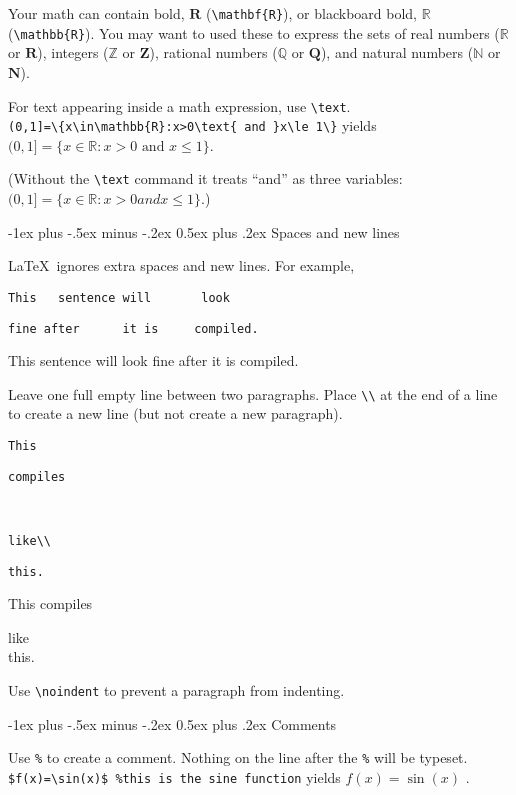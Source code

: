 \documentclass[10pt,landscape,letterpaper]{article}
\makeatletter
\renewcommand{\section}{\@startsection{section}{1}{0mm}%
                                {-1ex plus -.5ex minus -.2ex}%
                                {0.5ex plus .2ex}%
                                {\sffamily\large}}
\makeatother
\begin{document}
\begin{multicols}{3}
Your math can contain bold, $\mathbf{R}$ (\verb!\mathbf{R}!), or blackboard bold, $\mathbb{R}$ (\verb!\mathbb{R}!).
You may want to used these to express the sets of real numbers ($\mathbb{R}$ or $\mathbf{R}$), integers ($\mathbb{Z}$ or $\mathbf{Z}$), rational numbers ($\mathbb{Q}$ or $\mathbf{Q}$), and natural numbers ($\mathbb{N}$ or $\mathbf{N}$).

For text appearing inside a math expression, use \verb!\text!.\\
\verb!(0,1]=\{x\in\mathbb{R}:x>0\text{ and }x\le 1\}! yields\\
$(0,1]=\{x\in\mathbb{R}:x>0\text{ and }x\le 1\}$.

(Without the \verb!\text! command it treats ``and'' as three variables: $(0,1]=\{x\in\mathbb{R}:x>0 and x\le 1\}$.)

\section{Spaces and new lines}

\LaTeX\ ignores extra spaces and new lines. For example,

\verb!This   sentence will       look!

\verb!fine after      it is     compiled.!

This   sentence will       look
fine after      it is     compiled.

Leave one full empty line between two paragraphs. Place \verb!\\! at the end of a line to create a new line (but not create a new paragraph).

\verb!This!

\verb!compiles!

~

\verb!like\\!

\verb!this.!

This
compiles

like\\
this.

Use  \verb!\noindent! to prevent a paragraph from indenting.

\section{Comments}

Use \verb!%! to create a comment. Nothing on the line after the \verb!%! will be typeset. \verb!$f(x)=\sin(x)$ %this is the sine function! yields $f(x)=\sin(x)$%
.


\end{multicols}
\end{document}
